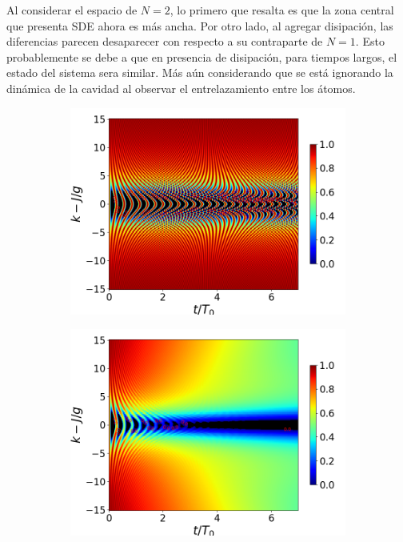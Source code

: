 Al considerar el espacio de $N=2$, lo primero que resalta es que la zona central que presenta SDE ahora es más ancha. Por otro lado, al agregar disipación, las diferencias parecen desaparecer con respecto a su contraparte de $N=1$. Esto probablemente se debe a que en presencia de disipación, para tiempos largos, el estado del sistema sera similar. Más aún considerando que se está ignorando la dinámica de la cavidad al observar el entrelazamiento entre los átomos.
\begin{figure}[h!]
    \centering
    \begin{subfigure}{0.49\textwidth}
        \includegraphics[width=\textwidth]{figuras/ch4/concu/k/eg1+ge1 d=0.0g x=0.0g J=15.0g gamma=0.25g concu k uni.png}
        \caption{}
        \label{fig4:concu k 1 uni}
    \end{subfigure}
    \hfill
    \begin{subfigure}{0.49\textwidth}
        \includegraphics[width=\textwidth]{figuras/ch4/concu/k/eg1+ge1 d=0.0g x=0.0g J=15.0g gamma=0.25g concu k dis.png}

\end{subfigure}
\end{figure}
